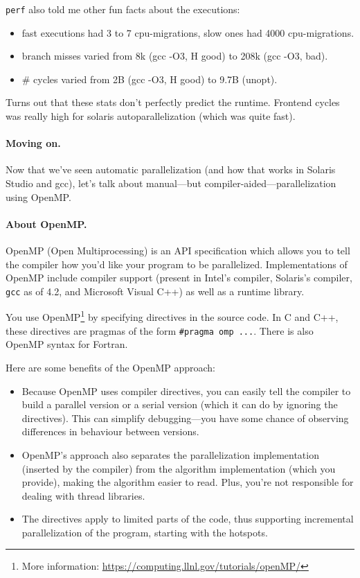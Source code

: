 \documentclass[11pt]{article}
\begin{document}
{\tt perf} also told me other fun facts about the executions:

\begin{itemize}
\item fast executions had 3 to 7 cpu-migrations, slow ones had 4000 cpu-migrations.
\item branch misses varied from 8k (gcc -O3, H good) to 208k (gcc -O3, bad).
\item \# cycles varied from 2B (gcc -O3, H good) to 9.7B (unopt).\\
\end{itemize}

Turns out that these stats don't perfectly predict the runtime. Frontend cycles was really
high for solaris autoparallelization (which was quite fast). 
      

\paragraph{Moving on.} Now that we've seen automatic parallelization (and how that works in Solaris Studio
and gcc), let's talk about manual---but compiler-aided---parallelization using OpenMP. 

\paragraph{About OpenMP.} OpenMP (Open Multiprocessing) 
is an API specification which allows you to tell the compiler how you'd 
like your program to be parallelized. Implementations of OpenMP 
include compiler support (present in Intel's compiler, Solaris's 
compiler, {\tt gcc} as of 4.2, and Microsoft Visual C++) as well as a 
runtime library.

You use OpenMP\footnote{More information:
  \url{https://computing.llnl.gov/tutorials/openMP/}} by specifying
directives in the source code. In C and C++, these directives are
pragmas of the form \verb+#pragma omp ...+. There is also OpenMP
syntax for Fortran. 

Here are some benefits of the OpenMP approach:
\begin{itemize}
\item Because OpenMP uses compiler directives, you can easily tell the
  compiler to build a parallel version or a serial version (which it can do by
  ignoring the directives). This can simplify debugging---you
  have some chance of observing differences in behaviour between 
  versions.
\item OpenMP's approach also separates the parallelization
  implementation (inserted by the compiler) from the algorithm
  implementation (which you provide), making the algorithm easier to
  read. Plus, you're not responsible for dealing with thread libraries.
\item The directives apply to limited parts of the code, thus supporting
  incremental parallelization of the program, starting with the hotspots.
\end{itemize}
\end{document}
